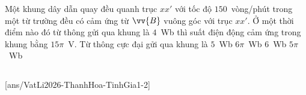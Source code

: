 	\begin{ex}%
		Một khung dây dẫn quay đều quanh trục $xx'$ với tốc độ $150$~vòng/phút trong một từ trường đều có cảm ứng từ $\vv{B}$ vuông góc với trục $xx'$. Ở một thời điểm nào đó từ thông gửi qua khung là $4$~Wb thì suất điện động cảm ứng trong khung bằng $15\pi$~V. Từ thông cực đại gửi qua khung là
		\choice
		{\True $5$~Wb}
		{$6\pi$~Wb}
		{$6$~Wb}
		{$5\pi$~Wb}
	\end{ex}

	\subsection*{}
	\setcounter{ex}{0}
	[ans/VatLi2026-ThanhHoa-TinhGia1-2]

